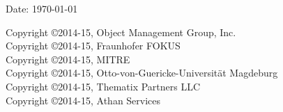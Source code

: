 \documentclass[10pt, a4paper, wd]{isov2}
\begin{document}
\nocite{OM2014,JYB-Festschrift2015-DOL,womo13,DOL-TKE2012,DOL-3semantics,blendingc3gi12,hyper2010}


\pagestyle{headings}  %

\begin{flushright}
  Date: \today

\end{flushright}




\thispagestyle{empty}
\clearpage

  

\noindent Copyright \copyright 2014-15, Object Management Group, Inc.\\
Copyright \copyright 2014-15, Fraunhofer FOKUS\\
Copyright \copyright 2014-15, MITRE\\
Copyright \copyright 2014-15, Otto-von-Guericke-Universit{\"a}t Magdeburg  \\
Copyright \copyright 2014-15, Thematix Partners LLC \\
Copyright \copyright 2014-15, Athan Services \\
\end{document}
